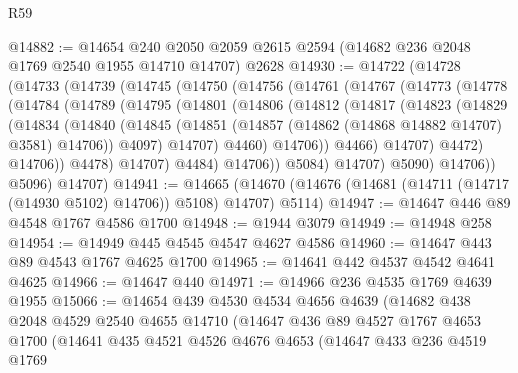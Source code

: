 \begin{lexlean}{R59}
\begin{coremodule}
@14882 := @14654
    @240
    @2050
    @2059
    @2615
    @2594
    (@14682 @236 @2048 @1769 @2540 @1955 @14710 @14707)
    @2628
@14930 := @14722
    (@14728
      (@14733
        (@14739
          (@14745
            (@14750
              (@14756
                (@14761
                  (@14767
                    (@14773
                      (@14778
                        (@14784
                          (@14789
                            (@14795
                              (@14801
                                (@14806
                                  (@14812
                                    (@14817
                                      (@14823
                                        (@14829
                                          (@14834
                                            (@14840
                                              (@14845
                                                (@14851
                                                  (@14857
                                                    (@14862 (@14868 @14882 @14707) @3581)
                                                    @14706))
                                                @4097)
                                              @14707)
                                            @4460)
                                          @14706))
                                      @4466)
                                    @14707)
                                  @4472)
                                @14706))
                            @4478)
                          @14707)
                        @4484)
                      @14706))
                  @5084)
                @14707)
              @5090)
            @14706))
        @5096)
      @14707)
@14941 := @14665
    (@14670 (@14676 (@14681 (@14711 (@14717 (@14930 @5102) @14706)) @5108) @14707) @5114)
@14947 := @14647 @446 @89 @4548 @1767 @4586 @1700
@14948 := @1944 @3079
@14949 := @14948 @258
@14954 := @14949 @445 @4545 @4547 @4627 @4586
@14960 := @14647 @443 @89 @4543 @1767 @4625 @1700
@14965 := @14641 @442 @4537 @4542 @4641 @4625
@14966 := @14647 @440
@14971 := @14966 @236 @4535 @1769 @4639 @1955
@15066 := @14654
    @439
    @4530
    @4534
    @4656
    @4639
    (@14682
      @438
      @2048
      @4529
      @2540
      @4655
      @14710
      (@14647
        @436
        @89
        @4527
        @1767
        @4653
        @1700
        (@14641
          @435
          @4521
          @4526
          @4676
          @4653
          (@14647
            @433
            @236
            @4519
            @1769

\end{coremodule}
\end{lexlean}
